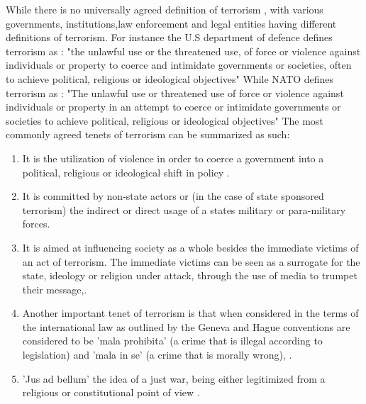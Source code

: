 While there is no universally agreed definition of terrorism \citep{ruby2002definition}, with various governments, institutions,law enforcement and legal entities having different definitions of terrorism. For instance the U.S department of defence defines terrorism as \citep{pub1998pub}:
"the unlawful use or the threatened use, of force or violence against individuals or property to coerce and intimidate governments or societies, often to achieve political, religious or ideological objectives"
While NATO defines terrorism as \citep{chase2013defining}:
"The unlawful use or threatened use of force or violence against individuals or property in an attempt to coerce or intimidate governments or societies to achieve political, religious or ideological objectives"
The most commonly agreed tenets of terrorism can be summarized as such:
\begin{enumerate}
\item It is the utilization of violence in order to coerce a government into a political, religious or ideological shift in policy \citep{chase2013defining}.
\item It is committed by non-state actors or (in the case of state sponsored terrorism) the indirect or direct usage of a states military or para-military forces.
\item It is aimed at influencing society as a whole besides the immediate victims of an act of terrorism. The immediate victims can be seen as a surrogate for the state, ideology or religion under attack, through the use of media to trumpet their message,\citep{el2014terrorist}.
\item Another important tenet of terrorism is that when considered in the terms of the  international law  as outlined by the Geneva and Hague conventions are considered to be 'mala prohibita' (a crime that is illegal according to legislation) and 'mala in se' (a crime that is morally wrong), \citep{ganor2002defining}.
\item 'Jus ad bellum' the idea of a just war, being either legitimized from a  religious or constitutional point of view \citep{kennedy1999one}. 
\end{enumerate}

